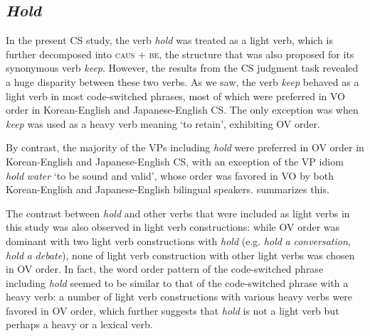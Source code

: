 \subsection{\textit{Hold}}\label{ch5:sect:5.7.4}

In the present \ac{CS} study, the verb \textit{hold} was treated as a light verb, which is further decomposed into \textsc{caus} \textsc{+} \textsc{be}, the structure that was also proposed for its synonymous verb \textit{keep}. However, the results from the \ac{CS} judgment task revealed a huge disparity between these two verbs. As we saw, the verb \textit{keep} behaved as a light verb in most code-switched phrases, most of which were preferred in \ac{VO} order in Korean-English and Japanese-English \ac{CS}. The only exception was when \textit{keep} was used as a heavy verb meaning ‘to retain’, exhibiting \ac{OV} order. 

By contrast, the majority of the \acs{VP}s including \textit{hold} were preferred in \ac{OV} order in Korean-English and Japanese-English \ac{CS}, with an exception of the \acs{VP} idiom \textit{hold} \textit{water} ‘to be sound and valid’, whose order was favored in \ac{VO} by both Korean-English and Japanese-English bilingual speakers.  summarizes this.

\begin{table}
\caption{Item-based analysis for \textit{hold} in Korean-English code-switching
(n$^0$ of occurrence 0–4: \textsc{OV} biased; 5–9: not biased; 10–14: \textsc{VO} biased)
}
\label{tab:5.6}
\end{table}

The contrast between \textit{hold} and other verbs that were included as light verbs in this study was also observed in light verb constructions: while \ac{OV} order was dominant with two light verb constructions with \textit{hold} (e.g. \textit{hold} \textit{a} \textit{conversation}, \textit{hold} \textit{a} \textit{debate}), none of light verb construction with other light verbs was chosen in \ac{OV} order. In fact, the word order pattern of the code-switched phrase including \textit{hold} seemed to be similar to that of the code-switched phrase with a heavy verb: a number of light verb constructions with various heavy verbs were favored in \ac{OV} order, which further suggests that \textit{hold} is not a light verb but perhaps a heavy or a lexical verb.

